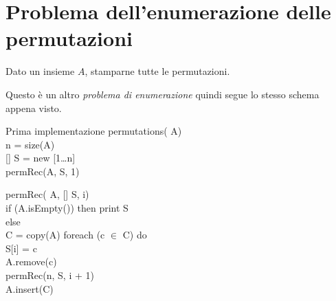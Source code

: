 \section{Problema dell'enumerazione delle permutazioni}
\begin{problem}
    Dato un insieme $A$, stamparne tutte le permutazioni.
\end{problem}

\noindent
Questo è un altro \emph{problema di enumerazione} quindi segue lo stesso schema
appena visto.

\begin{minicode}{Prima implementazione}
\ind permutations( A)\\
     n = size(A)\\
    [] S = new [1\dots n]\\
    permRec(A, S, 1)
\end{minicode}
\newpage
\begin{codecont}
permRec( A, [] S,  i)\\
    \ind if (A.isEmpty()) then\hfill{}
        \indf print S\\
    \ind else\\
        \indf{} C = copy(A)\hfill{}
        \indf foreach (c $\in$ C) do\\
            \indff S[i] = c\\
            \indff A.remove(c)\\
            \indff permRec(n, S, i + 1)\\
            \indff A.insert(C)
\end{codecont}

